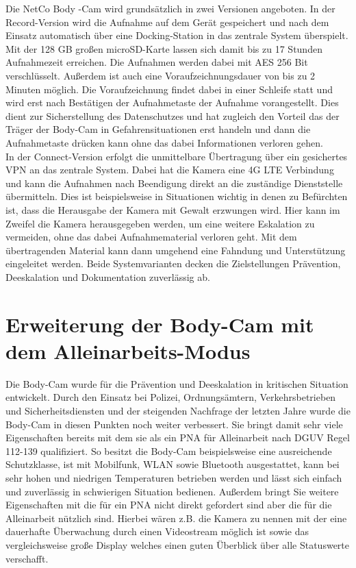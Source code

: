 \documentclass[thesis.tex]{subfiles}
\begin{document}
Die NetCo Body -Cam wird grundsätzlich in zwei Versionen angeboten.
In der Record-Version wird die Aufnahme auf dem Gerät gespeichert und nach dem Einsatz automatisch über eine Docking-Station in das zentrale System überspielt.
Mit der 128 GB großen microSD-Karte lassen sich damit bis zu 17 Stunden Aufnahmezeit erreichen.
Die Aufnahmen werden dabei mit AES 256 Bit verschlüsselt.
Außerdem ist auch eine Voraufzeichnungsdauer von bis zu 2 Minuten möglich.
Die Voraufzeichnung findet dabei in einer Schleife statt und wird erst nach Bestätigen der Aufnahmetaste der Aufnahme vorangestellt.
Dies dient zur Sicherstellung des Datenschutzes und hat zugleich den Vorteil das der Träger der Body-Cam in Gefahrensituationen erst handeln und dann die Aufnahmetaste drücken kann ohne das dabei Informationen verloren gehen.
\\

In der Connect-Version erfolgt die unmittelbare Übertragung über ein gesichertes VPN an das zentrale System.
Dabei hat die Kamera eine 4G LTE Verbindung und kann die Aufnahmen nach Beendigung direkt an die zuständige Dienststelle übermitteln.
Dies ist beispielsweise in Situationen wichtig in denen zu Befürchten ist, dass die Herausgabe der Kamera mit Gewalt erzwungen wird.
Hier kann im Zweifel die Kamera herausgegeben werden, um eine weitere Eskalation zu vermeiden, ohne das dabei Aufnahmematerial verloren geht.
Mit dem übertragenden Material kann dann umgehend eine Fahndung und Unterstützung eingeleitet werden.
Beide Systemvarianten decken die Zielstellungen Prävention, Deeskalation und Dokumentation zuverlässig ab.

\section{Erweiterung der Body-Cam mit dem Alleinarbeits-Modus}

Die Body-Cam wurde für die Prävention und Deeskalation in kritischen Situation entwickelt.
Durch den Einsatz bei Polizei, Ordnungsämtern, Verkehrsbetrieben und Sicherheitsdiensten und der steigenden Nachfrage der letzten Jahre wurde die Body-Cam in diesen Punkten noch weiter verbessert.
Sie bringt damit sehr viele Eigenschaften bereits mit dem sie als ein PNA für Alleinarbeit nach DGUV Regel 112-139 \cite[]{Regel_112-139} qualifiziert.
So besitzt die Body-Cam beispielsweise eine ausreichende Schutzklasse, ist mit Mobilfunk, WLAN sowie Bluetooth ausgestattet, kann bei sehr hohen und niedrigen Temperaturen betrieben werden und lässt sich einfach und zuverlässig in schwierigen Situation bedienen.
Außerdem bringt Sie weitere Eigenschaften mit die für ein PNA nicht direkt gefordert sind aber die für die Alleinarbeit nützlich sind.
Hierbei wären z.B. die Kamera zu nennen mit der eine dauerhafte Überwachung durch einen Videostream möglich ist sowie das vergleichsweise große Display welches einen guten Überblick über alle Statuswerte verschafft.
\\
\end{document}
